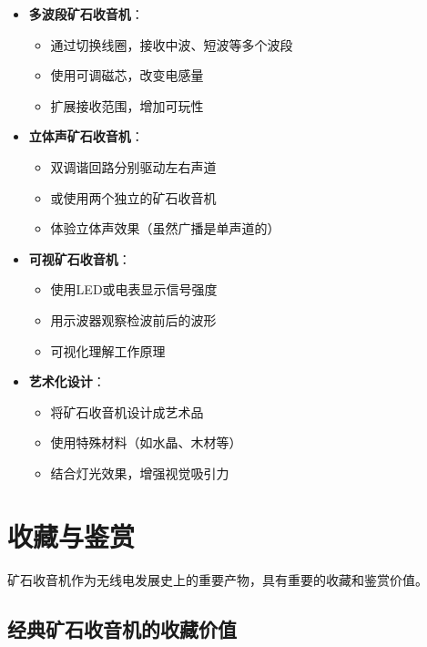 \documentclass[12pt,UTF8]{ctexbook}
\begin{document}
\begin{itemize}[leftmargin=3.5em]
    \item \textbf{多波段矿石收音机}：
        \begin{itemize}[leftmargin=3.5em]
            \item 通过切换线圈，接收中波、短波等多个波段
            \item 使用可调磁芯，改变电感量
            \item 扩展接收范围，增加可玩性
        \end{itemize}
    \item \textbf{立体声矿石收音机}：
        \begin{itemize}[leftmargin=3.5em]
            \item 双调谐回路分别驱动左右声道
            \item 或使用两个独立的矿石收音机
            \item 体验立体声效果（虽然广播是单声道的）
        \end{itemize}
    \item \textbf{可视矿石收音机}：
        \begin{itemize}[leftmargin=3.5em]
            \item 使用LED或电表显示信号强度
            \item 用示波器观察检波前后的波形
            \item 可视化理解工作原理
        \end{itemize}
    \item \textbf{艺术化设计}：
        \begin{itemize}[leftmargin=3.5em]
            \item 将矿石收音机设计成艺术品
            \item 使用特殊材料（如水晶、木材等）
            \item 结合灯光效果，增强视觉吸引力
        \end{itemize}
\end{itemize}

\section{收藏与鉴赏}

矿石收音机作为无线电发展史上的重要产物，具有重要的收藏和鉴赏价值。

\subsection{经典矿石收音机的收藏价值}
\end{document}
